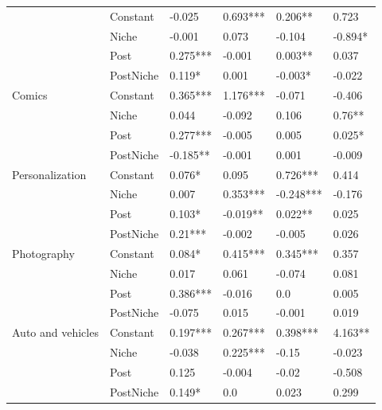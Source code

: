 \begin{longtable}[h!]{llllll}
\bottomrule
\endlastfoot
\multirow{4}{*}{Art and design} & Constant &              -0.025 &    0.693*** &    0.206** &      0.723 \\
          & Niche &              -0.001 &       0.073 &     -0.104 &    -0.894* \\
          & Post &            0.275*** &      -0.001 &    0.003** &      0.037 \\
          & PostNiche &              0.119* &       0.001 &    -0.003* &     -0.022 \\
\cline{1-6}
\multirow{4}{*}{Comics} & Constant &            0.365*** &    1.176*** &     -0.071 &     -0.406 \\
          & Niche &               0.044 &      -0.092 &      0.106 &     0.76** \\
          & Post &            0.277*** &      -0.005 &      0.005 &     0.025* \\
          & PostNiche &            -0.185** &      -0.001 &      0.001 &     -0.009 \\
\cline{1-6}
\multirow{4}{*}{Personalization} & Constant &              0.076* &       0.095 &   0.726*** &      0.414 \\
          & Niche &               0.007 &    0.353*** &  -0.248*** &     -0.176 \\
          & Post &              0.103* &    -0.019** &    0.022** &      0.025 \\
          & PostNiche &             0.21*** &      -0.002 &     -0.005 &      0.026 \\
\cline{1-6}
\multirow{4}{*}{Photography} & Constant &              0.084* &    0.415*** &   0.345*** &      0.357 \\
          & Niche &               0.017 &       0.061 &     -0.074 &      0.081 \\
          & Post &            0.386*** &      -0.016 &        0.0 &      0.005 \\
          & PostNiche &              -0.075 &       0.015 &     -0.001 &      0.019 \\
\cline{1-6}
\multirow{4}{*}{Auto and vehicles} & Constant &            0.197*** &    0.267*** &   0.398*** &    4.163** \\
          & Niche &              -0.038 &    0.225*** &      -0.15 &     -0.023 \\
          & Post &               0.125 &      -0.004 &      -0.02 &     -0.508 \\
          & PostNiche &              0.149* &         0.0 &      0.023 &      0.299 \\

\end{longtable}
